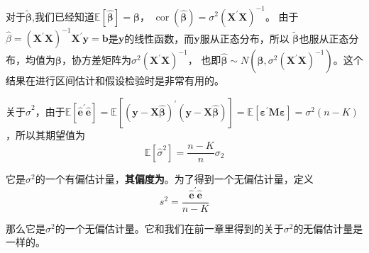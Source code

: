 	对于$ \tilde{\boldsymbol{\beta}} $,我们已经知道$ \mathbb{E}\left [ \boldsymbol{\hat{\beta}} \right ] = \boldsymbol{\beta} $，
	$ \operatorname{cor} \left ( \boldsymbol{\hat{\beta}} \right ) = \sigma^{2}\left ( \boldsymbol{X^{\prime}X} \right )^{-1} $。
	由于$ \hat{\beta} = \left ( \boldsymbol{X^{\prime}X} \right )^{-1} \boldsymbol{X^{\prime}y=b} $是$ \boldsymbol{y} $的线性函数，而$ \boldsymbol{y} $服从正态分布，所以
	$ \tilde{\boldsymbol{\beta}} $也服从正态分布，均值为$ \boldsymbol{\beta} $，协方差矩阵为$ \sigma^{2}\left ( \boldsymbol{X^{\prime}X} \right )^{-1} $，
	也即$ \boldsymbol{\hat{\beta}} \sim N \left ( \boldsymbol{\beta}, \sigma^{2}
	\left ( \boldsymbol{X^{\prime}X} \right )^{-1} \right ) $。这个结果在进行区间估计和假设检验时是非常有用的。
	
	关于$ \hat{\sigma}^{2} $，由于$ \mathbb{E} \left [ \boldsymbol{\hat{e}^{\prime}\hat{e}} \right ] 
	= \mathbb{E}\left [ \left ( \boldsymbol{y - X \hat{\beta}} \right)^{\prime} 
	\left ( \boldsymbol{y - X \hat{\beta}} \right ) \right ] 
	= \mathbb{E}\left [ \boldsymbol{\varepsilon^{\prime} M \varepsilon} \right ] 
	= \sigma^{2} \left ( n - K \right ) $，所以其期望值为
	$$ \mathbb{E} \left [ \hat{\sigma}^{2} \right ] = \frac{n - K}{n} \sigma_{2} $$
	
	它是$ \sigma^{2} $的一个有偏估计量，\textbf{其偏度为}。为了得到一个无偏估计量，定义
	$$ s^{2} = \frac{ \boldsymbol{\hat{e}^{\prime}\hat{e}}}{n - K} $$
	
	那么它是$ \sigma^{2} $的一个无偏估计量。它和我们在前一章里得到的关于$ \sigma^{2} $的无偏估计量是一样的。